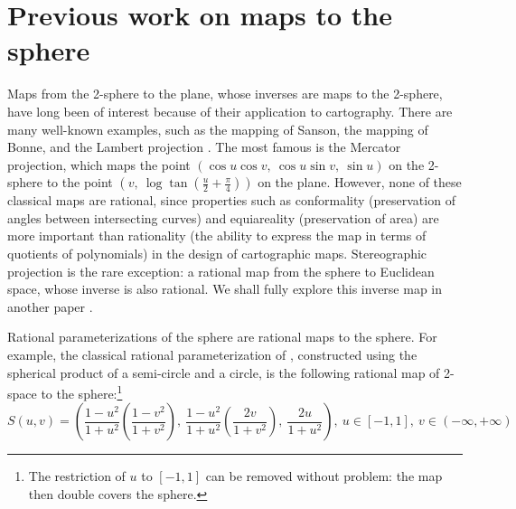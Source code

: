 \documentclass[11pt]{article}
\begin{document}


\section{Previous work on maps to the sphere}

Maps from the 2-sphere to the plane, whose inverses are maps to the 2-sphere,
have long been of interest because of their application to cartography.
There are many well-known examples, such as the mapping of Sanson,
the mapping of Bonne, and the Lambert projection \cite{kreyszig59}.
The most famous is the Mercator projection, which maps the point
$(\cos u \cos v,\ \cos u \sin v,\ \sin u)$ on the 2-sphere 
to the point $(v,\ \log \tan (\frac{u}{2} + \frac{\pi}{4}))$ on the plane.
However, none of these classical maps are rational,
since properties such as conformality (preservation of angles between 
intersecting curves) and equiareality (preservation of area) are more important than
rationality (the ability to express the map in terms of quotients of polynomials)
in the design of cartographic maps.
Stereographic projection is the rare exception: a rational 
map from the sphere to Euclidean space, whose inverse is also rational.
We shall fully explore this inverse map in another paper \cite{jj}.


Rational parameterizations of the sphere are rational maps to the sphere.
For example, the classical rational parameterization of , constructed using the
spherical product \cite{barr81} of a semi-circle and a circle,
is the following rational map of 2-space to the sphere:\footnote{The 
  restriction of $u$ to $[-1,1]$
  can be removed without problem: the map then double covers the sphere.}
\begin{equation}
\label{eq:s2param}
S(u,v) = (\frac{1-u^2}{1+u^2}(\frac{1-v^2}{1+v^2}),\  
          \frac{1-u^2}{1+u^2}(\frac{2v}{1+v^2}),\  \frac{2u}{1+u^2}),\ 
u \in [-1,1],\ v \in (-\infty,+\infty)
\end{equation}
\end{document}
